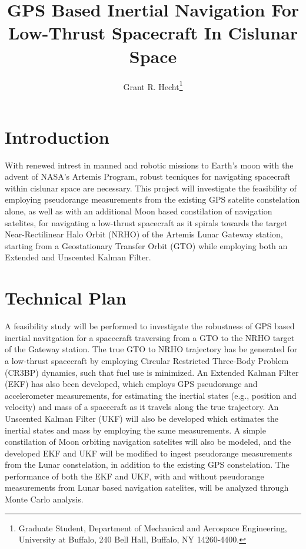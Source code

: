 \documentclass[letterpaper, submit]{AAS}			%
\begin{document}
\title{GPS Based Inertial Navigation For Low-Thrust Spacecraft In Cislunar Space}

\author{Grant R. Hecht\thanks{Graduate Student, Department of Mechanical and Aerospace Engineering, University at Buffalo, 240 Bell Hall, Buffalo, NY  14260-4400.}}

\maketitle{} 		

\section{Introduction}
With renewed intrest in manned and robotic missions to Earth's moon with the advent of NASA's Artemis Program, robust tecniques for navigating spacecraft within cislunar space are necessary. This project will investigate the feasibility of employing pseudorange measurements from the existing GPS satelite constelation alone, as well as with an additional Moon based constilation of navigation satelites, for navigating a low-thrust spacecraft as it spirals towards the target Near-Rectilinear Halo Orbit (NRHO) of the Artemis Lunar Gateway station, starting from a Geostationary Transfer Orbit (GTO) while employing both an Extended and Unscented Kalman Filter. 

\section{Technical Plan}
A feasibility study will be performed to investigate the robustness of GPS based inertial navitgation for a spacecraft traversing from a GTO to the NRHO target of the Gateway station. The true GTO to NRHO trajectory has be generated for a low-thrust spacecraft by employing Circular Restricted Three-Body Problem (CR3BP) dynamics, such that fuel use is minimized. An Extended Kalman Filter (EKF) has also been developed, which employs GPS pseudorange and accelerometer measurements, for estimating the inertial states (e.g., position and velocity) and mass of a spacecraft as it travels along the true trajectory. An Unscented Kalman Filter (UKF) will also be developed which estimates the inertial states and mass by employing the same measurements. A simple constilation of Moon orbiting navigation satelites will also be modeled, and the developed EKF and UKF will be modified to ingest pseudorange measurements from the Lunar constelation, in addition to the existing GPS constelation. The performance of both the EKF and UKF, with and without pseudorange measurements from Lunar based navigation satelites, will be analyzed through Monte Carlo analysis.
\end{document}
